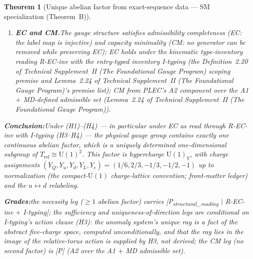 \documentclass[11pt]{article}
\newtheorem{theorem}{Theorem}[section]
\theoremstyle{definition}
\newcommand{\U}{\mathrm{U}}
\newcommand{\TSII}{Technical Supplement~II (\emph{The Foundational Gauge Program})}
\begin{document}
\begin{theorem}[Unique abelian factor from exact-sequence data ---
SM specialization (Theorem~B)]
\begin{enumerate}[label=(H\arabic*),nosep]
  so any torus action factoring through those invariants gives
  $Y_u = Y_d$ on every direction --- the hypercharge ray does not lie
  in that image.  Antecedently distinct types (clause one) must
  therefore carry antecedently distinct central characters (clause
  two) for the closure below to go through; generation universality
  (C3 of Theorem~\ref{thm:conditional_classification}) is part of the
  same clause --- $c$ is a function of type, acting identically on the
  three generation copies.
  \item \textbf{EC and CM.}\quad The gauge structure satisfies
  admissibility completeness (EC: the label map is injective) and
  capacity minimality (CM: no generator can be removed while
  preserving EC); EC holds under the kinematic type-inventory reading
  R-EC-inv with the entry-typed inventory I-typing (the
  Definition~2.20 of \TSII{} scoping premise and
  Lemma~2.24 of \TSII{}'s premise list); CM from PLEC's A2
  component over the A1 $+$ MD-defined admissible set
  (Lemma~2.24 of \TSII{}).
\end{enumerate}

\smallskip\noindent\textbf{Conclusion:}\quad Under (H1)--(H4) --- in
particular under EC as read through R-EC-inv with I-typing (H3--H4)
--- the physical gauge group
contains exactly one continuous abelian factor, which is a uniquely
determined one-dimensional subgroup of $T_{\mathrm{rel}} \cong
\mathrm{U}(1)^2$.  This factor is hypercharge $\U(1)_Y$, with charge
assignments $(Y_Q, Y_u, Y_d, Y_L, Y_e) =
(1/6, 2/3, -1/3, -1/2, -1)$ up to normalization (the compact-$\U(1)$
charge-lattice convention; front-matter ledger) and the
$u \leftrightarrow d$ relabeling.

\smallskip\noindent\textbf{Grades:}\quad the necessity leg ($\ge 1$
abelian factor) carries
[P\textsubscript{structural\_reading} $\mid$ R-EC-inv $+$ I-typing];
the sufficiency and uniqueness-of-direction legs are conditional on
I-typing's action clause (H3): the anomaly system's unique ray is a
fact of the abstract five-charge space, computed unconditionally, and
that the ray lies in the image of the relative-torus action is
supplied by H3, not derived; the CM leg (no second factor) is [P]
(A2 over the A1 $+$ MD admissible set).
\end{theorem}
\end{document}
